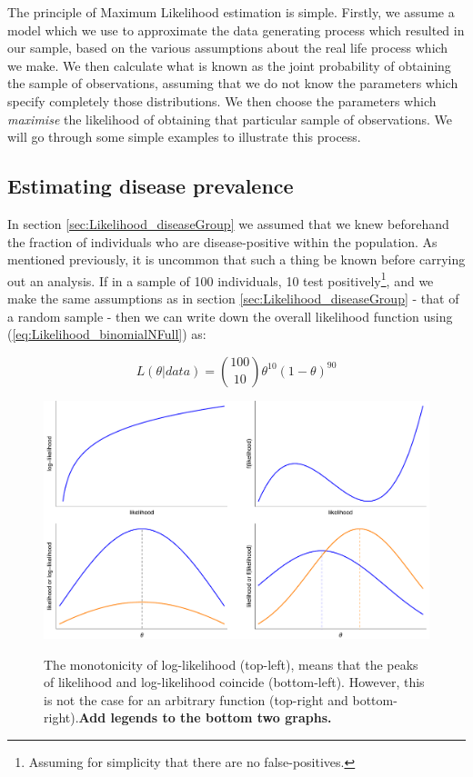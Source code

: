 \documentclass[11pt,fullpage]{book}
\begin{document}
The principle of Maximum Likelihood estimation is simple. Firstly, we assume a model which we use to approximate the data generating process which resulted in our sample, based on the various assumptions about the real life process which we make. We then calculate what is known as the joint probability of obtaining the sample of observations, assuming that we do not know the parameters which specify completely those distributions. We then choose the parameters which \textit{maximise} the likelihood of obtaining that particular sample of observations. We will go through some simple examples to illustrate this process. 

\subsection{Estimating disease prevalence}\label{sec:Likelihood_diseaseMLE}
In section \ref{sec:Likelihood_diseaseGroup} we assumed that we knew beforehand the fraction of individuals who are disease-positive within the population. As mentioned previously, it is uncommon that such a thing be known before carrying out an analysis. If in a sample of 100 individuals, 10 test positively\footnote{Assuming for simplicity that there are no false-positives.}, and we make the same assumptions as in section \ref{sec:Likelihood_diseaseGroup} - that of a random sample - then we can write down the overall likelihood function using (\ref{eq:Likelihood_binomialNFull}) as:

\begin{equation}\label{eq:Likelihood_binomialNew}
L(\theta|data) = {100 \choose 10} \theta^{10} (1-\theta)^{90}
\end{equation}

\begin{figure}
\centering
\scalebox{0.4} 
{\includegraphics{Likelihood_logMonotonicity.pdf}}
\caption{The monotonicity of log-likelihood (top-left), means that the peaks of likelihood and log-likelihood coincide (bottom-left). However, this is not the case for an arbitrary function (top-right and bottom-right).\textbf{Add legends to the bottom two graphs.} }\label{fig:Likelihood_logMonotonicity}
\end{figure}
\end{document}
